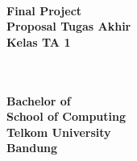 {\centering
\large
{\bigsize\bf \Title}\\
\vspace{ 2cm}
\rm
\iflogTA
\textbf{Final Project}\\
\vspace{0.5 cm}
\else
\textbf{Proposal Tugas Akhir}\\
\vspace{0.5 cm}
\textbf{Kelas TA 1}\\
\fi
\vspace{0.5 cm}
\textbf{\Author}\\ \textbf{\NIM}\\ 

\vspace{1.5 cm}

\begin{figure}[h]
{\par}
\end{figure}

\vspace{2 cm}
{\bigsize\textbf{Bachelor of \Prodi}\\
\vspace{0.5 cm}
\textbf{School of Computing}\\
\vspace{0.5 cm}
\textbf{Telkom University}\\
\vspace{0.5 cm}
\textbf{Bandung}\\
\vspace{0.5 cm}
\textbf{\Date}\\}
}